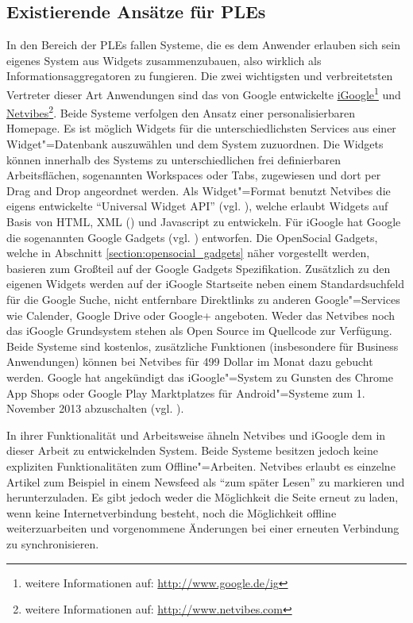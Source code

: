 \subsection{Existierende Ansätze für \acp{PLE}}
In den Bereich der \acp{PLE} fallen Systeme, die es dem Anwender erlauben sich sein eigenes System aus Widgets zusammenzubauen, also wirklich als Informationsaggregatoren zu fungieren. Die zwei wichtigsten und verbreitetsten Vertreter dieser Art Anwendungen sind das von Google entwickelte \href{http://www.google.de/ig}{iGoogle}\footnote{weitere Informationen auf: \url{http://www.google.de/ig}} und \href{http://www.netvibes.com}{Netvibes}\footnote{weitere Informationen auf: \url{http://www.netvibes.com}}. Beide Systeme verfolgen den Ansatz einer personalisierbaren Homepage. Es ist möglich Widgets für die unterschiedlichsten Services aus einer Widget"=Datenbank auszuwählen und dem System zuzuordnen. Die Widgets können innerhalb des Systems zu unterschiedlichen frei definierbaren Arbeitsflächen, sogenannten Workspaces oder Tabs, zugewiesen und dort per Drag and Drop angeordnet werden. Als Widget"=Format benutzt Netvibes die eigens entwickelte "`Universal Widget API"' (vgl. \cite{UWAJSRuntime2012}), welche erlaubt Widgets auf Basis von \ac{HTML}, \acs{XML} () und Javascript zu entwickeln. Für iGoogle hat Google die sogenannten Google Gadgets (vgl. \cite{GoogleGadgetsApi2012}) entworfen. Die OpenSocial Gadgets, welche in Abschnitt \ref{section:opensocial_gadgets} näher vorgestellt werden, basieren zum Großteil auf der Google Gadgets Spezifikation. Zusätzlich zu den eigenen Widgets werden auf der iGoogle Startseite neben einem Standardsuchfeld für die Google Suche, nicht entfernbare Direktlinks zu anderen Google"=Services wie Calender, Google Drive oder Google+ angeboten. Weder das Netvibes noch das iGoogle Grundsystem stehen als Open Source im Quellcode zur Verfügung. Beide Systeme sind kostenlos, zusätzliche Funktionen (insbesondere für Business Anwendungen) können bei Netvibes für 499 Dollar im Monat dazu gebucht werden. Google hat angekündigt das iGoogle"=System zu Gunsten des Chrome App Shops oder Google Play Marktplatzes für Android"=Systeme zum 1. November 2013 abzuschalten (vgl. \cite{Google2012}).

In ihrer Funktionalität und Arbeitsweise ähneln Netvibes und iGoogle dem in dieser Arbeit zu entwickelnden System. Beide Systeme besitzen jedoch keine expliziten Funktionalitäten zum Offline"=Arbeiten. Netvibes erlaubt es einzelne Artikel zum Beispiel in einem Newsfeed als "`zum später Lesen"' zu markieren und herunterzuladen. Es gibt jedoch weder die Möglichkeit die Seite erneut zu laden, wenn keine Internetverbindung besteht, noch die Möglichkeit offline weiterzuarbeiten und vorgenommene Änderungen bei einer erneuten Verbindung zu synchronisieren. 

